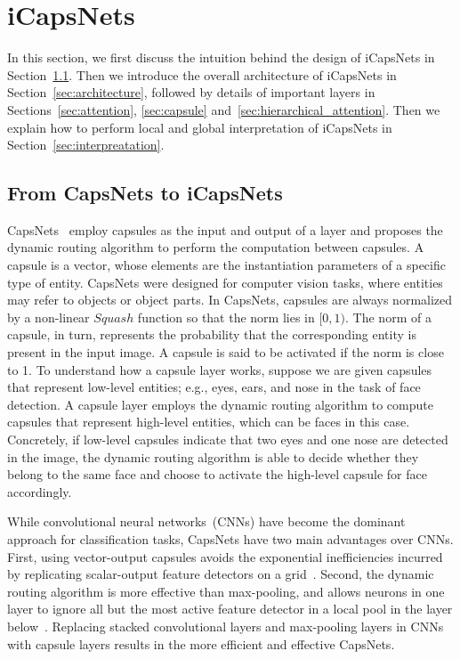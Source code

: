 \documentclass[10pt,journal,compsoc]{IEEEtran}
\begin{document}
\section{iCapsNets}\label{sec:model}

In this section, we first discuss the intuition behind the design of iCapsNets in Section~\ref{sec:motivation}. Then we introduce the overall architecture of iCapsNets in Section~\ref{sec:architecture}, followed by details of important layers in Sections~\ref{sec:attention}, \ref{sec:capsule} and~\ref{sec:hierarchical_attention}. Then we explain how to perform local and global interpretation of iCapsNets in Section~\ref{sec:interpreatation}.

\subsection{From CapsNets to iCapsNets}\label{sec:motivation}

CapsNets~\cite{sabour2017dynamic} employ capsules as the input and output of a layer and proposes the dynamic routing algorithm to perform the computation between capsules. A capsule is a vector, whose elements are the instantiation parameters of a specific type of entity. CapsNets were designed for computer vision tasks, where entities may refer to objects or object parts. In CapsNets, capsules are always normalized by a non-linear $Squash$ function so that the norm lies in $[0,1)$. The norm of a capsule, in turn, represents the probability that the corresponding entity is present in the input image. A capsule is said to be activated if the norm is close to 1. To understand how a capsule layer works, suppose we are given capsules that represent low-level entities; e.g., eyes, ears, and nose in the task of face detection. A capsule layer employs the dynamic routing algorithm to compute capsules that represent high-level entities, which can be faces in this case. Concretely, if low-level capsules indicate that two eyes and one nose are detected in the image, the dynamic routing algorithm is able to decide whether they belong to the same face and choose to activate the high-level capsule for face accordingly.

While convolutional neural networks~(CNNs) have become the dominant approach for classification tasks, CapsNets have two main advantages over CNNs. First, using vector-output capsules avoids the exponential inefficiencies incurred by replicating scalar-output feature detectors on a grid~\cite{hinton2011transforming}. Second, the dynamic routing algorithm is more effective than max-pooling, and allows neurons in one layer to ignore all but the most active feature detector in a local pool in the layer below~\cite{sabour2017dynamic}. Replacing stacked convolutional layers and max-pooling layers in CNNs with capsule layers results in the more efficient and effective CapsNets.
\end{document}
